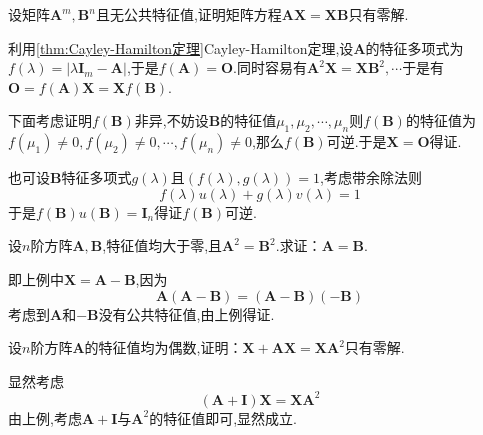 \begin{brown}
\begin{example}
    设矩阵$\bm{A}^m,\bm{B}^n$且无公共特征值,证明矩阵方程$\bm{AX}=\bm{XB}$只有零解.
\end{example}
\begin{Proof}
    利用\cref{thm:Cayley-Hamilton定理}\textup{Cayley-Hamilton}定理,设$\bm{A}$的特征多项式为$f\left(\lambda\right)=\left|\lambda\bm{I}_m-\bm{A}\right|$,于是$f\left(\bm{A}\right)=\bm{O}$.同时容易有$\bm{A}^2\bm{X}=\bm{XB}^2,\cdots$于是有$\bm{O}=f\left(\bm{A}\right)\bm{X}=\bm{X}f\left(\bm{B}\right).$
    
    下面考虑证明$f\left(\bm{B}\right)$非异,不妨设$\bm{B}$的特征值$\mu_1,\mu_2,\cdots,\mu_n$则$f\left(\bm{B}\right)$的特征值为$f\left(\mu_1\right)\neq 0,f\left(\mu_2\right)\neq 0,\cdots,f\left(\mu_n\right)\neq 0$,那么$f\left(\bm{B}\right)$可逆.于是$\bm{X}=\bm{O}$得证.

    也可设$\bm{B}$特征多项式$g\left(\lambda\right)$且$\left(
        f\left(\lambda\right),g\left(\lambda\right)
    \right)=1$,考虑带余除法则
    \[
    f\left(\lambda\right)u\left(\lambda\right)+g\left(\lambda\right)v\left(\lambda\right)=1
    \]于是$f\left(\bm{B}\right)u\left(\bm{B}\right)=\bm{I}_n$得证$f\left(\bm{B}\right)$可逆.
\end{Proof}
\end{brown}
\begin{brown}
\begin{example}
    设$n$阶方阵$\bm{A},\bm{B}$,特征值均大于零,且$\bm{A}^2=\bm{B}^2.$求证：$\bm{A}=\bm{B}$.
\end{example}
\begin{Proof}
    即上例中$\bm{X}=\bm{A}-\bm{B}$,因为
    \[
    \bm{A}\left(\bm{A}-\bm{B}\right)=
    \left(\bm{A}-\bm{B}\right)\left(-\bm{B}\right)
    \]考虑到$\bm{A}$和$-\bm{B}$没有公共特征值,由上例得证.
\end{Proof}
\end{brown}
\begin{brown}
\begin{example}
    设$n$阶方阵$\bm{A}$的特征值均为偶数,证明：$\bm{X}+\bm{AX}=\bm{XA}^2$只有零解.
\end{example}
\begin{Proof}
显然考虑
\[
\left(\bm{A}+\bm{I}\right)\bm{X}=\bm{X}\bm{A}^2
\]由上例,考虑$\bm{A}+\bm{I}$与$\bm{A}^2$的特征值即可,显然成立.
\end{Proof}
\end{brown}
